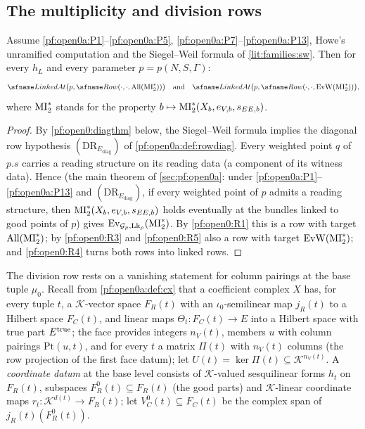 \subsection{The multiplicity and division rows}\label{sec:pf:open0:mi}

\begin{proposition}[Multiplicity]\label{pf:open0:mi}
Assume \ref{pf:open0a:P1}--\ref{pf:open0a:P5}, \ref{pf:open0a:P7}--\ref{pf:open0a:P13}, Howe's unramified computation and
the Siegel--Weil formula of \cref{lit:families:sw}. Then for every $h_L$ and every parameter $p=p(N,S,\Gamma)$:
\[
\openzeroLinked\bigl(p,\openzeroRow(\cdot,\cdot,\openzeroAll(\openzeroMI))\bigr)\quad\text{and}\quad
\openzeroLinked\bigl(p,\openzeroRow(\cdot,\cdot,\openzeroEvW(\openzeroMI))\bigr),
\]
where $\mathrm{MI}^{*}_{2}$ stands for the property $b\mapsto\mathrm{MI}^{*}_{2}(X_b,e_{V,b},s_{EE,b})$.
\ 
\end{proposition}

\begin{proof}
By \cref{pf:open0:diagthm} below, the Siegel--Weil formula implies the diagonal row hypothesis
$(\mathrm{DR}_{E_{\mathrm{diag}}})$ of \cref{pf:open0a:def:rowdiag}. Every weighted point $q$ of $p.s$ carries a reading
structure on its reading data (a component of its witness data). Hence 
(the main theorem of \cref{sec:pf:open0a}: under \ref{pf:open0a:P1}--\ref{pf:open0a:P13} and
$(\mathrm{DR}_{E_{\mathrm{diag}}})$, if every weighted point of $p$ admits a reading structure, then
$\mathrm{MI}^{*}_{2}(X_b,e_{V,b},s_{EE,b})$ holds eventually at the bundles linked to good points of $p$) gives
$\mathrm{Ev}_{\mathcal{G}_p,\mathrm{Lk}_p}(\mathrm{MI}^{*}_{2})$. By \ref{pf:open0:R1} this is a row with target
$\mathrm{All}(\mathrm{MI}^{*}_{2})$; by \ref{pf:open0:R3} and \ref{pf:open0:R5} also a row with target $\mathrm{EvW}(\mathrm{MI}^{*}_{2})$; and
\ref{pf:open0:R4} turns both rows into linked rows.
\end{proof}

The division row rests on a vanishing statement for column pairings at the base tuple $\mu_0$. Recall from
\cref{pf:open0a:def:cx} that a coefficient complex $X$ has, for every tuple $t$, a $\mathcal K$-vector space $F_R(t)$ with an
$\iota_0$-semilinear map $j_R(t)$ to a Hilbert space $F_C(t)$, and linear maps $\Theta_t\colon F_C(t)\to E$ into a Hilbert space with
true part $E^{\mathrm{true}}$; the face provides integers $n_V(t)$, members $u$ with column pairings $\mathrm{Pt}(u,t)$, and for every
$t$ a matrix $\Pi(t)$ with $n_V(t)$ columns (the row projection of the first face datum); let $U(t)=\ker\Pi(t)\subseteq
\mathcal K^{n_V(t)}$. A \emph{coordinate datum} at the base level consists of $\mathcal K$-valued sesquilinear forms $h_t$ on $F_R(t)$,
subspaces $F^0_R(t)\subseteq F_R(t)$ (the good parts) and $\mathcal K$-linear coordinate maps $r_t\colon\mathcal K^{d(t)}\to F_R(t)$;
let $V^0_C(t)\subseteq F_C(t)$ be the complex span of $j_R(t)(F^0_R(t))$.

